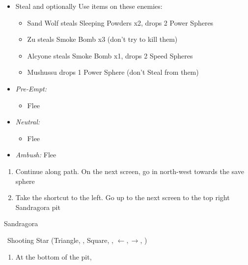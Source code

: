 \begin{encounters}
    \begin{itemize}
        \item Steal and optionally Use items on these enemies:
        \begin{itemize}
            \item Sand Wolf steals Sleeping Powders x2, drops 2 Power Spheres
            \item Zu steals Smoke Bomb x3 (don't try to kill them)
            \item Alcyone steals Smoke Bomb x1, drops 2 Speed Spheres
            \item Mushussu drops 1 Power Sphere (don't Steal from them)
        \end{itemize}
        \item \textit{Pre-Empt:}
        \begin{itemize}
            \tidusf Defend
            \rikkuf Steal or Use a Smoke Bomb/Silence Grenade/Sleeping Powder
            \luluf Defend
            \item Flee
        \end{itemize}
        \item \textit{Neutral:}
        \begin{itemize}
            \switch{\tidus}{\kimahri}
            \kimahrif Steal
            \rikkuf Switch for \tidus\ or Use a Smoke Bomb/Silence Grenade/Sleeping Powder
            \item Flee
        \end{itemize}
        \item \textit{Ambush:} Flee
    \end{itemize}
\end{encounters}
\begin{enumerate}[resume]
    \item Continue along path. On the next screen, go in north-west towards the save sphere
    \item Take the shortcut to the left. Go up to the next screen to the top right Sandragora pit
\end{enumerate}
\begin{battle}{Sandragora}
    \begin{itemize}
        \switch{\tidus}{\auron}
        \auronf \od\ Shooting Star (Triangle, \Cancel, Square, \Confirm, $\leftarrow, \rightarrow$, \Confirm)
    \end{itemize}
\end{battle}
\begin{enumerate}[resume]
    \item At the bottom of the pit, 
\end{enumerate}
